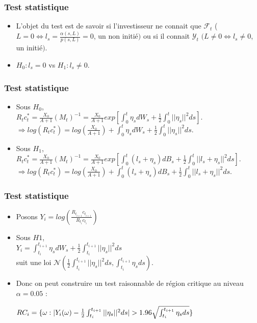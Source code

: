 \documentclass[french]{beamer}
\begin{document}
\begin{frame}
\frametitle{Test statistique}
\begin{itemize}
\item L'objet du test est de savoir si l'investisseur ne connait que $\mathcal{F}_t$ ($L = 0 \Leftrightarrow l_s = \frac{\alpha(s,L)}{p(s, L)} = 0$, un non initié$)$ ou si il connait $\mathcal{Y}_t$ $(L \neq 0 \Leftrightarrow l_s \neq 0$, un initié$)$.
\item $H_0 : l_s = 0$ vs $H_1 : l_s \neq 0$.
\end{itemize}
\end{frame}

\begin{frame}
\frametitle{Test statistique}
\begin{itemize}
\item Sous $H_0$, \\
$R_t c^*_t = \frac{X_0}{A+1} (M_t)^{-1} = \frac{X_0}{A+1} exp[\int_{0}^{t}\eta_s dW_s + \frac{1}{2} \int_{0}^{t} ||\eta_s||^2 ds]$.\\
$\Rightarrow log(R_t c^*_t) = log(\frac{X_0}{A+1}) + \int_{0}^{t}\eta_s dW_s + \frac{1}{2} \int_{0}^{t} ||\eta_s||^2 ds$.
\item Sous $H_1$, \\
$R_t c^*_t = \frac{X_0}{A+1} (M_t)^{-1} = \frac{X_0}{A+1} exp[\int_{0}^{t}(l_s +\eta_s) dB_s + \frac{1}{2} \int_{0}^{t} ||l_s + \eta_s||^2 ds]$.\\
$\Rightarrow log(R_t c^*_t) = log(\frac{X_0}{A+1}) + \int_{0}^{t}(l_s + \eta_s) dB_s + \frac{1}{2} \int_{0}^{t} ||l_s + \eta_s||^2 ds$.
\end{itemize}
\end{frame}

\begin{frame}
\frametitle{Test statistique}
\begin{itemize}
\item Posons $Y_i = log(\frac{R_{t_{i+1}}c_{t_{i+1}}}{R_{t_{i}}c_{t_{i}}})$\\
\item Sous $H1$,\\
$Y_i = \int_{t_{i}}^{t_{i+1}} \eta_s dW_s  + \frac{1}{2}\int_{t_{i}}^{t_{i+1}} ||\eta_s||^2 ds$\\
suit une loi $\mathcal{N}(\frac{1}{2}\int_{t_{i}}^{t_{i+1}} ||\eta_s||^2 ds, \int_{t_{i}}^{t_{i+1}} \eta_s ds)$.
\item Donc on peut construire un test raisonnable de région critique au niveau $\alpha = 0.05$ : 
\begin{center}
$RC_i = \Large \{ \omega : \large |Y_i (\omega) - \frac{1}{2}\int_{t_{i}}^{t_{i+1}} ||\eta_s||^2 ds \large| > 1.96 \sqrt{\int_{t_{i}}^{t_{i+1}} \eta_s ds} \Large \}$
\end{center}
\end{itemize}
\end{frame}
\end{document}

